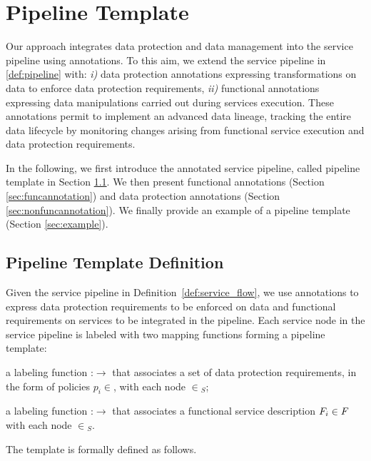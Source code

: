 \section{Pipeline Template}
Our approach integrates data protection and data management into the service pipeline using annotations.
To this aim, we extend the service pipeline in \cref{def:pipeline} with: \emph{i)} data protection annotations expressing transformations on data to enforce data protection requirements, \emph{ii)} functional annotations expressing data manipulations carried out during services execution.
These annotations permit to implement an advanced data lineage, tracking the entire data lifecycle by monitoring changes arising from functional service execution and data protection requirements.

In the following, we first introduce the annotated service pipeline, called pipeline template in Section \ref{sec:templatedefinition}. We then present functional annotations (Section \ref{sec:funcannotation}) and data protection annotations (Section \ref{sec:nonfuncannotation}). We finally provide an example of a pipeline template (Section \ref{sec:example}).


\subsection{Pipeline Template Definition}\label{sec:templatedefinition}
Given the service pipeline in Definition~\ref{def:service_flow}, we use annotations to express data protection requirements to be enforced on data and functional requirements on services to be integrated in the pipeline. Each service node in the service pipeline is labeled with two mapping functions forming a pipeline template:
\begin{enumerate*}[label=\roman*)]
  \item a labeling function \myLambda:\V$\rightarrow$\Pset{} that associates a set of data protection requirements, in the form of policies $p_i\in$\Pset{}, with each node $\in$\V$_S$; 
  \item a labeling function \myGamma:\V$\rightarrow$\F{} that associates a functional service description $F_i\in F_{}$ with each node $\in$\V$_S$.
\end{enumerate*}

The template is formally defined as follows.

